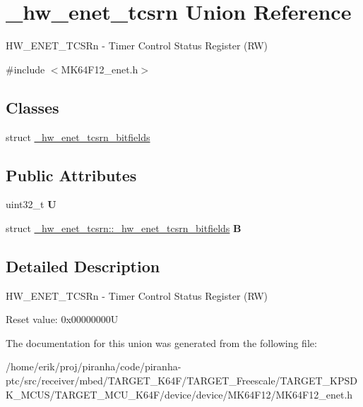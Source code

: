 \hypertarget{union__hw__enet__tcsrn}{}\section{\+\_\+hw\+\_\+enet\+\_\+tcsrn Union Reference}
\label{union__hw__enet__tcsrn}


H\+W\+\_\+\+E\+N\+E\+T\+\_\+\+T\+C\+S\+Rn -\/ Timer Control Status Register (RW)  




{\ttfamily \#include $<$M\+K64\+F12\+\_\+enet.\+h$>$}

\subsection*{Classes}
\begin{DoxyCompactItemize}
\item 
struct \hyperlink{struct__hw__enet__tcsrn_1_1__hw__enet__tcsrn__bitfields}{\+\_\+hw\+\_\+enet\+\_\+tcsrn\+\_\+bitfields}
\end{DoxyCompactItemize}
\subsection*{Public Attributes}
\begin{DoxyCompactItemize}
\item 
uint32\+\_\+t {\bfseries U}\hypertarget{union__hw__enet__tcsrn_ae4f17881c80511e011c08e6769a509c0}{}\label{union__hw__enet__tcsrn_ae4f17881c80511e011c08e6769a509c0}

\item 
struct \hyperlink{struct__hw__enet__tcsrn_1_1__hw__enet__tcsrn__bitfields}{\+\_\+hw\+\_\+enet\+\_\+tcsrn\+::\+\_\+hw\+\_\+enet\+\_\+tcsrn\+\_\+bitfields} {\bfseries B}\hypertarget{union__hw__enet__tcsrn_acc28fcc5f84690b415bd0f5d543a7bfd}{}\label{union__hw__enet__tcsrn_acc28fcc5f84690b415bd0f5d543a7bfd}

\end{DoxyCompactItemize}


\subsection{Detailed Description}
H\+W\+\_\+\+E\+N\+E\+T\+\_\+\+T\+C\+S\+Rn -\/ Timer Control Status Register (RW) 

Reset value\+: 0x00000000U 

The documentation for this union was generated from the following file\+:\begin{DoxyCompactItemize}
\item 
/home/erik/proj/piranha/code/piranha-\/ptc/src/receiver/mbed/\+T\+A\+R\+G\+E\+T\+\_\+\+K64\+F/\+T\+A\+R\+G\+E\+T\+\_\+\+Freescale/\+T\+A\+R\+G\+E\+T\+\_\+\+K\+P\+S\+D\+K\+\_\+\+M\+C\+U\+S/\+T\+A\+R\+G\+E\+T\+\_\+\+M\+C\+U\+\_\+\+K64\+F/device/device/\+M\+K64\+F12/M\+K64\+F12\+\_\+enet.\+h\end{DoxyCompactItemize}
